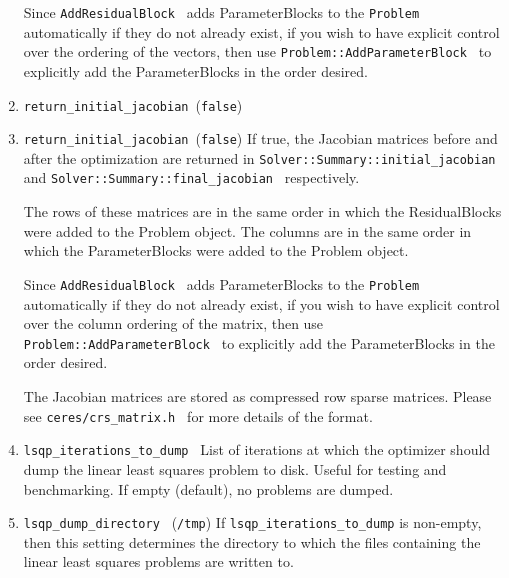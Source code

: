 \begin{enumerate}
Since \texttt{AddResidualBlock } adds ParameterBlocks to the \texttt{Problem } automatically if they do not already exist, if you wish to have explicit control over the ordering of the vectors, then use \texttt{Problem::AddParameterBlock } to explicitly add the ParameterBlocks in the order desired.

\item{\texttt{return\_initial\_jacobian }}(\texttt{false})
\item{\texttt{return\_initial\_jacobian }}(\texttt{false})
If true, the Jacobian matrices before and after the optimization are returned in \texttt{Solver::Summary::initial\_jacobian } and \texttt{Solver::Summary::final\_jacobian } respectively.

The rows of these matrices are in the same order in which the ResidualBlocks were added to the Problem object. The columns are in the same order in which the ParameterBlocks were added to the Problem object.

Since \texttt{AddResidualBlock } adds ParameterBlocks to the \texttt{Problem } automatically if they do not already exist, if you wish to have explicit control over the column ordering of the matrix, then use \texttt{Problem::AddParameterBlock } to explicitly add the ParameterBlocks in the order desired.

The Jacobian matrices are stored as compressed row sparse matrices. Please see \texttt{ceres/crs\_matrix.h } for more details of the format.

\item{\texttt{lsqp\_iterations\_to\_dump }}
 List of iterations at which the optimizer should dump the
     linear least squares problem to disk. Useful for testing and
     benchmarking. If empty (default), no problems are dumped.

\item{\texttt{lsqp\_dump\_directory }} (\texttt{/tmp})
 If \texttt{lsqp\_iterations\_to\_dump} is non-empty, then this setting determines the directory to which the files containing the linear least squares problems are written to.



\end{enumerate}

